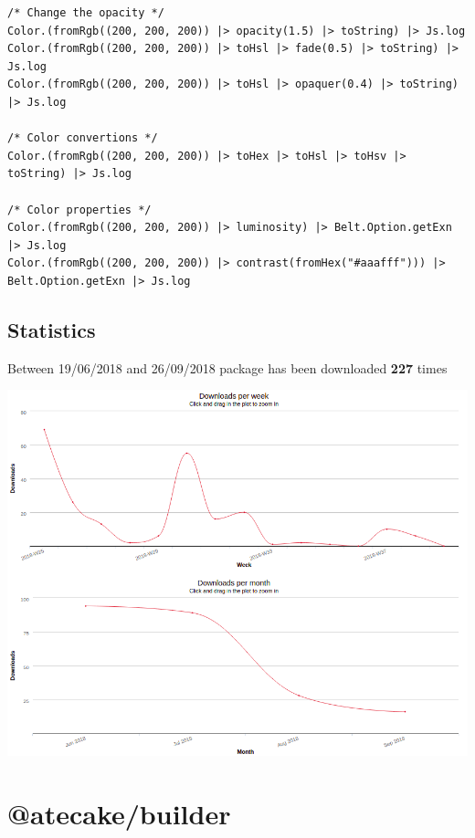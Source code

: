 \documentclass{article}
\begin{document}
\begin{lstlisting}
/* Change the opacity */
Color.(fromRgb((200, 200, 200)) |> opacity(1.5) |> toString) |> Js.log
Color.(fromRgb((200, 200, 200)) |> toHsl |> fade(0.5) |> toString) |> Js.log
Color.(fromRgb((200, 200, 200)) |> toHsl |> opaquer(0.4) |> toString) |> Js.log

/* Color convertions */
Color.(fromRgb((200, 200, 200)) |> toHex |> toHsl |> toHsv |> toString) |> Js.log

/* Color properties */
Color.(fromRgb((200, 200, 200)) |> luminosity) |> Belt.Option.getExn |> Js.log
Color.(fromRgb((200, 200, 200)) |> contrast(fromHex("#aaafff"))) |> Belt.Option.getExn |> Js.log
\end{lstlisting}

\subsection{Statistics}
\begin{flushleft}
Between 19/06/2018 and 26/09/2018 package has been downloaded \textbf{227} times
\end{flushleft}

\begin{center}
  \includegraphics[scale=0.5]{color-re.png}
\end{center}

\newpage

\section{@atecake/builder}
\end{document}
